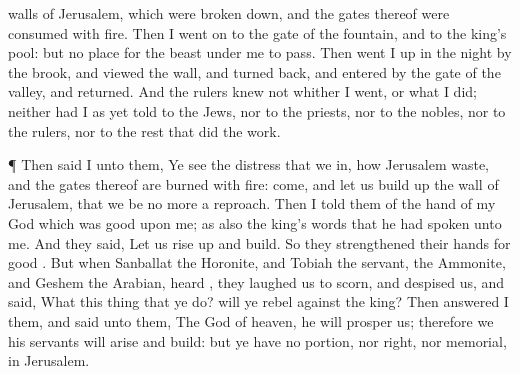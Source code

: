 {walls of
Jerusalem, which were broken
down, and the
gates thereof were
consumed with
fire.
Then I went
on to the
gate of the
fountain, and to the
king’s
pool: but
{} no
place for the
beast
{} under me to
pass.
Then went I
up in the
night by the
brook, and
viewed the
wall, and turned
back, and
entered by the
gate of the
valley, and
{}
returned.
And the
rulers
knew not whither I
went, or what I
did; neither had I as
yet
told
{} to the
Jews, nor to the
priests, nor to the
nobles, nor to the
rulers, nor to the
rest that
did the
work.
\par }{\PP {}¶ Then
said I unto them, Ye
see the
distress that we
{} in, how
Jerusalem
{}
waste, and the
gates thereof are
burned with
fire:
come, and let us build
up the
wall of
Jerusalem, that we be no more a
reproach.
Then I
told them of the
hand of my
God which was
good upon me; as also the
king’s
words that he had
spoken unto me. And they
said, Let us rise
up and
build. So they
strengthened their
hands for
{}
good
{}.
But when
Sanballat the
Horonite, and
Tobiah the
servant, the
Ammonite, and
Geshem the
Arabian,
heard
{}, they laughed us to
scorn, and
despised us, and
said, What
{} this
thing that ye
do? will ye
rebel against the
king?
Then
answered I them, and
said unto them, The
God of
heaven, he will
prosper us; therefore we his
servants will
arise and
build: but ye have no
portion, nor
right, nor
memorial, in
Jerusalem.

}
